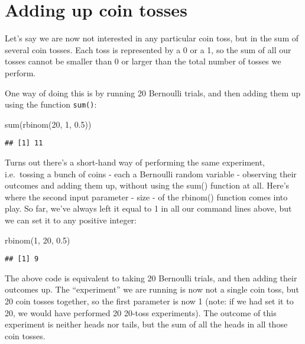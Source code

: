\documentclass[
]{book}
\newenvironment{Shaded}{\begin{snugshade}}{\end{snugshade}}
\newcommand{\DecValTok}[1]{\textcolor[rgb]{0.00,0.00,0.81}{#1}}
\newcommand{\FloatTok}[1]{\textcolor[rgb]{0.00,0.00,0.81}{#1}}
\newcommand{\FunctionTok}[1]{\textcolor[rgb]{0.00,0.00,0.00}{#1}}
\newcommand{\NormalTok}[1]{#1}
\begin{document}
\hypertarget{adding-up-coin-tosses}{%
\section{Adding up coin tosses}\label{adding-up-coin-tosses}}

Let's say we are now not interested in any particular coin toss, but in the sum of several coin tosses. Each toss is represented by a 0 or a 1, so the sum of all our tosses cannot be smaller than 0 or larger than the total number of tosses we perform.

One way of doing this is by running 20 Bernoulli trials, and then adding them up using the function \texttt{sum()}:

\begin{Shaded}
\begin{Highlighting}[]
\FunctionTok{sum}\NormalTok{(}\FunctionTok{rbinom}\NormalTok{(}\DecValTok{20}\NormalTok{, }\DecValTok{1}\NormalTok{, }\FloatTok{0.5}\NormalTok{))}
\end{Highlighting}
\end{Shaded}

\begin{verbatim}
## [1] 11
\end{verbatim}

Turns out there's a short-hand way of performing the same experiment, i.e.~tossing a bunch of coins - each a Bernoulli random variable - observing their outcomes and adding them up, without using the sum() function at all. Here's where the second input parameter - size - of the rbinom() function comes into play. So far, we've always left it equal to 1 in all our command lines above, but we can set it to any positive integer:

\begin{Shaded}
\begin{Highlighting}[]
\FunctionTok{rbinom}\NormalTok{(}\DecValTok{1}\NormalTok{, }\DecValTok{20}\NormalTok{, }\FloatTok{0.5}\NormalTok{)}
\end{Highlighting}
\end{Shaded}

\begin{verbatim}
## [1] 9
\end{verbatim}

The above code is equivalent to taking 20 Bernoulli trials, and then adding their outcomes up. The ``experiment'' we are running is now not a single coin toss, but 20 coin tosses together, so the first parameter is now 1 (note: if we had set it to 20, we would have performed 20 20-toss experiments). The outcome of this experiment is neither heads nor tails, but the sum of all the heads in all those coin tosses.
\end{document}
